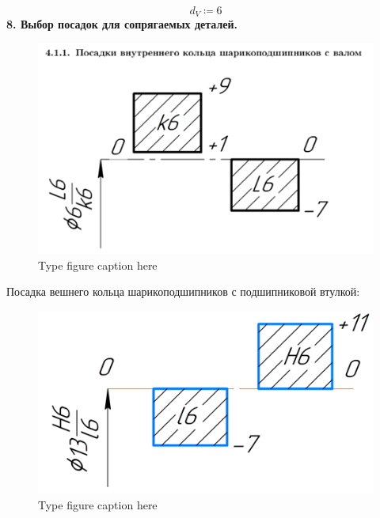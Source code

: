 \documentclass{article}
\newcommand{\defeq}{\coloneq} %
\begin{document}
\begin{equation*}
d_{V} \defeq 6
\end{equation*}
\colorbox[HTML]{000000}{\textbf{8. Выбор посадок для сопрягаемых деталей.}}\newline
\begin{figure}[h!]
 \begin{center}
  \includegraphics[max width=\textwidth]{calculations/398.png}
  \caption{Type figure caption here}
  \label{fig:398}
 \end{center}
\end{figure}
\colorbox[HTML]{000000}{Посадка вешнего кольца шарикоподшипников с подшипниковой втулкой:}\newline
\begin{figure}[h!]
 \begin{center}
  \includegraphics[max width=\textwidth]{calculations/400.png}
  \caption{Type figure caption here}
  \label{fig:400}
 \end{center}
\end{figure}
\end{document}
